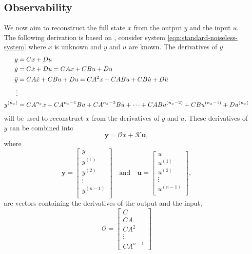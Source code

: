 \subsection{Observability}
We now aim to reconstruct the full state $x$ from the output $y$ and the input $u$. The following derivation is based on \cite{StephenBoyd2009ObservabilitySlides}, consider system \eqref{eqn:standard-noiseless-system} where $x$ is unknown and $y$ and $u$ are known. The derivatives of $y$ 
\[
\begin{split}
y &= Cx + Du \\
\dot{y} &= C\dot{x} + Du =  CAx + CBu + D\dot{u} \\
\Ddot{y} &= CA\dot{x} + CBu + Du = CA^{2}x + CABu + CB\dot{u} + D\Ddot{u} \\
\vdots \\
y^{(n_x)} &= CA^{n_x}x + CA^{n_x-1}Bu + CA^{n_x-2}B\dot{u} + \dots + CABu^{(n_x-2)} + CBu^{(n_x-1)} + Du^{(n_x)}
\end{split}
\]
will be used to reconstruct $x$ from the derivatives of $y$ and $u$. These derivatives of $y$ can be combined into
\[ \mathbf{y} =  \mathcal{O}x + \mathcal{K}\mathbf{u}
,\]
where
\[\mathbf{y}=
\begin{bmatrix}
    y \\
    y^{(1)} \\
    y^{(2)} \\
    \vdots \\
    y^{(n-1)} \\
\end{bmatrix} \quad \text{and} \quad
\mathbf{u} = 
\begin{bmatrix}
    u \\
    u^{(1)} \\
    u^{(2)} \\
    \vdots \\
    u^{(n-1)} \\
\end{bmatrix},
\]
are vectors containing the derivatives of the output and the input,
\begin{equation}\label{eqn:observability-matrix}
    \mathcal{O}=
    \begin{bmatrix}
        C \\
        CA \\
        CA^2 \\
        \vdots \\
        CA^{n-1}
    \end{bmatrix}    
\end{equation}

